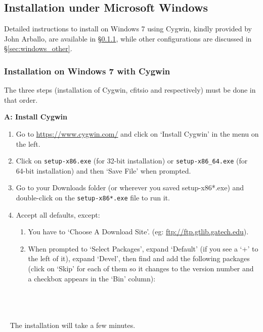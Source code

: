 \documentclass[12pt,twoside]{article}
\begin{document}
\subsection{Installation under Microsoft Windows}
\label{sec:windows}
Detailed instructions to install \healpix on Windows 7 using Cygwin, kindly provided by John Arballo, 
are available in \S\ref{sec:windows_seven}, 
while other configurations are discussed in \S\ref{sec:windows_other}.
\subsubsection{Installation on Windows 7 with Cygwin}
\label{sec:windows_seven}
The three steps (installation of Cygwin, cfitsio and \healpix respectively) must be done in that order.

\textbf{A: Install Cygwin}
\begin{enumerate}
	\setlength{\itemsep}{-1pt}
	\setlength{\parsep}{-10pt}
\item Go to \url{https://www.cygwin.com/}
and click on `Install Cygwin' in the menu on the left.

\item Click on \texttt{setup-x86.exe} (for 32-bit installation) or 
\texttt{setup-x86\_64.exe}
(for 64-bit installation) and then `Save File' when prompted.

\item Go to your Downloads folder (or wherever you saved setup-x86*.exe) and
double-click on the \texttt{setup-x86*.exe} file to run it.

\item Accept all defaults, except:

\begin{enumerate}
	\setlength{\itemsep}{-1pt}
	\setlength{\parsep}{-10pt}
\item
  You have to `Choose A Download Site'. (eg:
  \url{ftp://ftp.gtlib.gatech.edu}).
\item
  When prompted to `Select Packages', expand `Default' (if you see a `+'
  to the left of it), expand `Devel', then find and add the following
  packages (click on `Skip' for each of them so it changes to the
  version number and a checkbox appears in the `Bin' column):\\
 \\
 \\
 \\
\end{enumerate}
\end{enumerate}
~ The installation will take a few minutes.
\end{document}
